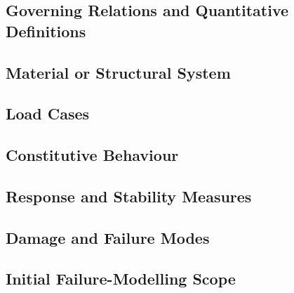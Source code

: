 \subsection{Governing Relations and Quantitative Definitions}
\label{sec:res-str-dmg-governing-relations}

%

\subsection{Material or Structural System}
\label{sec:res-str-dmg-material-structural-system}


\subsection{Load Cases}
\label{sec:res-str-dmg-load-cases}


\subsection{Constitutive Behaviour}
\label{sec:res-str-dmg-constitutive-behaviour}


\subsection{Response and Stability Measures}
\label{sec:res-str-dmg-response-stability-measures}


\subsection{Damage and Failure Modes}
\label{sec:res-str-dmg-damage-failure-modes}


\subsection{Initial Failure-Modelling Scope}
\label{subsec:res_str_dmg_initial_failure_scope}

